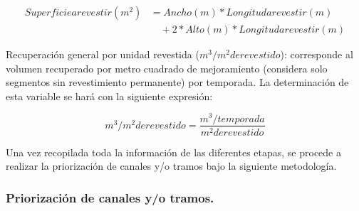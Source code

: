 \documentclass[]{article}
\begin{document}
\begin{itemize}
\begin{equation}
\begin{split}
	Superficie a revestir (m^2)& = Ancho (m) * Longitud a revestir (m)\\
	&\quad + 2 * Alto (m) * Longitud a revestir (m)  
\end{split}
\end{equation}

Recuperación general por unidad revestida ($m^3/m^2 de revestido$): corresponde al volumen recuperado por metro cuadrado de mejoramiento (considera solo segmentos sin revestimiento permanente) por temporada. La determinación de esta variable se hará con la siguiente expresión:

\begin{equation}
m^3/m^2 de revestido = \frac{m^3/temporada} {m^2 de revestido}  
\end{equation}

\end{itemize}
Una vez recopilada toda la información de las diferentes etapas, se procede a realizar la priorización de canales y/o tramos bajo la siguiente metodología.

\subsubsection{Priorización de canales y/o tramos.}
\end{document}
